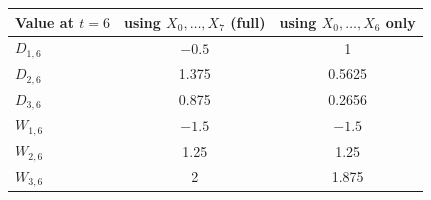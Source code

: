 \begin{tabular}{lcc}
\toprule
Value at $t=6$ & using $X_0,\dots,X_7$ (full) & using $X_0,\dots,X_6$ only \\
\midrule
$D_{1,6}$ & $-0.5$ & 1 \\
$D_{2,6}$ & 1.375 & 0.5625 \\
$D_{3,6}$ & 0.875 & 0.2656 \\
$W_{1,6}$ & $-1.5$ & $-1.5$ \\
$W_{2,6}$ & 1.25 & 1.25 \\
$W_{3,6}$ & 2 & 1.875 \\
\bottomrule
\end{tabular}